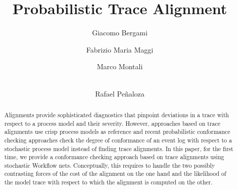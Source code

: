 \documentclass[runningheads]{llncs}
\begin{document}
%
\title{Probabilistic Trace Alignment}
%
%
\author{
	Giacomo Bergami \and
	Fabrizio Maria Maggi \and
	Marco Montali \and \\
	Rafael Pe\~naloza}

%

%
%
\maketitle              %
\linespread{0.92}
\vspace{-0.5cm}

\begin{abstract}
Alignments provide sophisticated diagnostics that pinpoint deviations in a trace with respect to a process model and their severity. However, approaches based on trace alignments use crisp process models as reference and recent probabilistic conformance checking approaches check the degree of conformance of an event log with respect to a stochastic process model instead of finding trace alignments. In this paper, for the first time, we provide a conformance checking approach based on trace alignments using stochastic Workflow nets. Conceptually, this requires to handle the two possibly contrasting forces of the cost of the alignment on the one hand and the likelihood of the model trace with respect to which the alignment is computed on the other.
\end{abstract}
\end{document}
